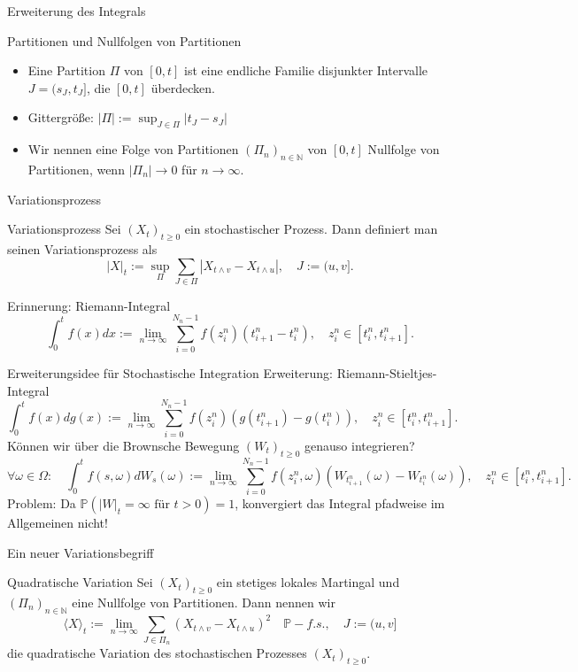 \documentclass[11pt,aspectratio=169]{beamer}
\begin{document}
\begin{frame}{Erweiterung des Integrals} 
  \begin{block}{Partitionen und Nullfolgen von Partitionen}
    \begin{itemize}
      \item Eine Partition $\Pi$ von $[0,t]$ ist eine endliche Familie disjunkter Intervalle $J = (s_J, t_J]$, die $[0,t]$ überdecken.
      \item Gittergröße: $|\Pi| := \sup_{J \in \Pi} |t_J - s_J|$
      \item Wir nennen eine Folge von Partitionen $(\Pi_n)_{n \in \mathbb{N}}$ von $[0,t]$ Nullfolge von Partitionen, wenn $|\Pi_n| \to 0$ für $n \to \infty$.
    \end{itemize}
  \end{block}

\end{frame}


\begin{frame}{Variationsprozess}
\begin{block}{Variationsprozess}
  Sei $(X_t)_{t \geq 0}$ ein stochastischer Prozess. Dann definiert man seinen Variationsprozess als
  \[
  |X|_t := \sup_\Pi \sum_{J \in \Pi} |X_{t \wedge v} - X_{t \wedge u}|, \quad J := (u,v].
  \]
  \end{block}
  Erinnerung: Riemann-Integral 
\[
\int_0^t f(x) dx := \lim_{n \to \infty} \sum_{i=0}^{N_n-1} f(z_i^n) (t_{i+1}^n - t_i^n), \quad z_i^n \in [t_{i}^n, t_{i+1}^n].
\] 
\end{frame}


\begin{frame}{Erweiterungsidee für Stochastische Integration}
Erweiterung: Riemann-Stieltjes-Integral
\[
\int_0^t f(x) dg(x) := \lim_{n \to \infty} \sum_{i=0}^{N_n-1} f(z_i^n) (g(t_{i+1}^n) - g(t_i^n)), \quad z_i^n \in [t_{i}^n, t_{i+1}^n].
\] 
Können wir über die Brownsche Bewegung $(W_t)_{t \geq 0}$ genauso integrieren? 
\[
\forall \omega \in \Omega: \quad \int_0^t f(s,\omega) dW_s(\omega) := \lim_{n \to \infty} \sum_{i=0}^{N_n-1} f(z_i^n,\omega) (W_{t_{i+1}^n}(\omega) - W_{t_{i}^n}(\omega)), \quad z_i^n \in [t_{i}^n, t_{i+1}^n].
\]
Problem: Da $\mathbb{P}(|W|_t = \infty \text{ für } t > 0) = 1$, konvergiert das Integral pfadweise im Allgemeinen nicht!
\end{frame}


\begin{frame}{Ein neuer Variationsbegriff}

  \begin{block}{Quadratische Variation}
    Sei $(X_t)_{t \geq 0}$ ein stetiges lokales Martingal und $(\Pi_n)_{n \in \mathbb{N}}$ eine Nullfolge von Partitionen. Dann nennen wir 
    \[
    \langle X \rangle_t := \lim_{n \to \infty} \sum_{J \in \Pi_n} (X_{t \wedge v} - X_{t \wedge u})^2 \quad \mathbb{P}-f.s., \quad J := (u,v]
    \]
    die quadratische Variation des stochastischen Prozesses $(X_t)_{t \geq 0}$.
  \end{block}
\end{frame}
\end{document}
